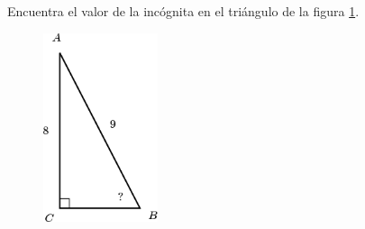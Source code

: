Encuentra el valor de la incógnita en el triángulo de la figura \ref{fig:angle_functrig_07}.
\begin{figure}[H]
    \begin{center}
        \includegraphics[width=0.3\textwidth]{../images/angle_functrig_07.png}
    \end{center}
    \caption{}
    \label{fig:angle_functrig_07}
\end{figure}